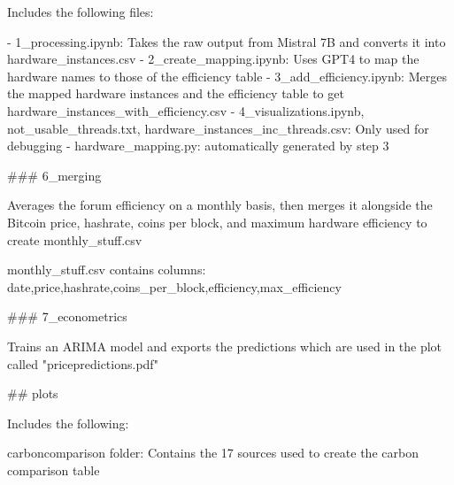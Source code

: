 Includes the following files:

- 1_processing.ipynb: Takes the raw output from Mistral 7B and converts it into hardware_instances.csv
- 2_create_mapping.ipynb: Uses GPT4 to map the hardware names to those of the efficiency table
- 3_add_efficiency.ipynb: Merges the mapped hardware instances and the efficiency table to get hardware_instances_with_efficiency.csv
- 4_visualizations.ipynb, not_usable_threads.txt, hardware_instances_inc_threads.csv: Only used for debugging
- hardware_mapping.py: automatically generated by step 3

### 6_merging

Averages the forum efficiency on a monthly basis, then merges it alongside the Bitcoin price, hashrate, coins per block, and maximum hardware efficiency to create monthly_stuff.csv

monthly_stuff.csv contains columns: date,price,hashrate,coins_per_block,efficiency,max_efficiency

### 7_econometrics

Trains an ARIMA model and exports the predictions which are used in the plot called "pricepredictions.pdf"


## plots

Includes the following:

carboncomparison folder: Contains the 17 sources used to create the carbon comparison table